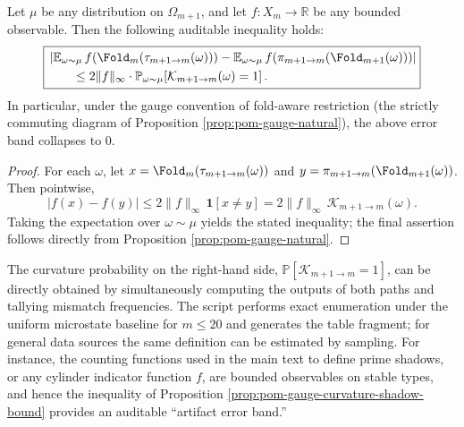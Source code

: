 \begin{proposition}\label{prop:pom-gauge-curvature-shadow-bound}
Let \(\mu\) be any distribution on \(\Omega_{m+1}\), and let \(f:X_m\to\mathbb{R}\) be any bounded observable.
Then the following auditable inequality holds:
\[
\boxed{
\begin{aligned}
&\left|\mathbb E_{\omega\sim\mu}\,f(\Fold_m(\tau_{m+1\to m}(\omega)))
-\mathbb E_{\omega\sim\mu}\,f(\pi_{m+1\to m}(\Fold_{m+1}(\omega)))\right|\\
&\qquad \le 2\|f\|_\infty\cdot \mathbb P_{\omega\sim\mu}\!\left[\mathcal{K}_{m+1\to m}(\omega)=1\right].
\end{aligned}}
\]
In particular, under the gauge convention of fold-aware restriction (the strictly commuting diagram of Proposition \ref{prop:pom-gauge-natural}), the above error band collapses to \(0\).
\end{proposition}
\begin{proof}
For each \(\omega\), let
\(
x=\Fold_m(\tau_{m+1\to m}(\omega))
\)
and
\(
y=\pi_{m+1\to m}(\Fold_{m+1}(\omega))
\).
Then pointwise,
\[
|f(x)-f(y)|
\le
2\|f\|_\infty\,\mathbf 1[x\neq y]
=
2\|f\|_\infty\,\mathcal{K}_{m+1\to m}(\omega).
\]
Taking the expectation over \(\omega\sim\mu\) yields the stated inequality; the final assertion follows directly from Proposition \ref{prop:pom-gauge-natural}.
\end{proof}

\begin{remark}\label{rem:pom-gauge-curvature-audit}
The curvature probability on the right-hand side,
\(\mathbb P[\mathcal{K}_{m+1\to m}=1]\),
can be directly obtained by simultaneously computing the outputs of both paths and tallying mismatch frequencies.
The script  performs exact enumeration under the uniform microstate baseline for \(m\le 20\) and generates the table fragment; for general data sources the same definition can be estimated by sampling.
For instance, the counting functions used in the main text to define prime shadows, or any cylinder indicator function \(f\), are bounded observables on stable types, and hence the inequality of Proposition \ref{prop:pom-gauge-curvature-shadow-bound} provides an auditable ``artifact error band.''
\end{remark}



